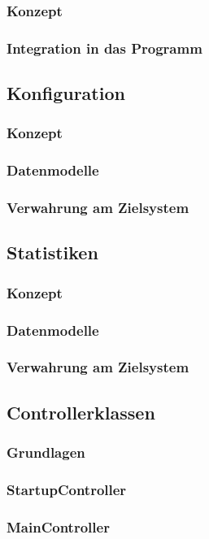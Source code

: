 \subsubsection{Konzept}
\subsubsection{Integration in das Programm}
\subsection{Konfiguration}\label{subsec:konfiguration}
\subsubsection{Konzept}
\subsubsection{Datenmodelle}
\subsubsection{Verwahrung am Zielsystem}

\subsection{Statistiken}
\subsubsection{Konzept}
\subsubsection{Datenmodelle}
\subsubsection{Verwahrung am Zielsystem}

\subsection{Controllerklassen}
\subsubsection{Grundlagen}
\subsubsection{StartupController}
\subsubsection{MainController}
